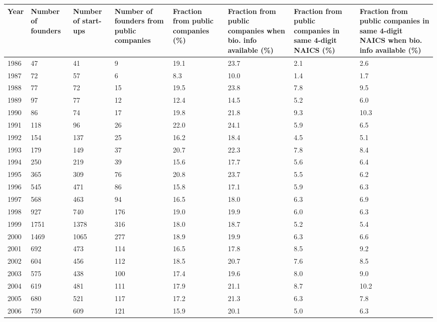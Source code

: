 \begin{table}[!htb]
\centering
\begingroup\scriptsize
\begin{tabular}{p{1.75cm}p{1.75cm}p{1.75cm}p{1.75cm}p{1.75cm}p{1.75cm}p{1.75cm}p{1.75cm}}
  \toprule
Year & Number of founders & Number of start-ups & Number of founders from public companies & Fraction from public companies (\%) & Fraction from public companies when bio. info available (\%) & Fraction from public companies in same 4-digit NAICS (\%) & Fraction from public companies in same 4-digit NAICS when bio. info available (\%) \\ 
  \midrule
1986 & 47 & 41 &  9 & 19.1 & 23.7 & 2.1 & 2.6 \\ 
  1987 & 72 & 57 &  6 & 8.3 & 10.0 & 1.4 & 1.7 \\ 
  1988 & 77 & 72 & 15 & 19.5 & 23.8 & 7.8 & 9.5 \\ 
  1989 & 97 & 77 & 12 & 12.4 & 14.5 & 5.2 & 6.0 \\ 
  1990 & 86 & 74 & 17 & 19.8 & 21.8 & 9.3 & 10.3 \\ 
  1991 & 118 & 96 & 26 & 22.0 & 24.1 & 5.9 & 6.5 \\ 
  1992 & 154 & 137 & 25 & 16.2 & 18.4 & 4.5 & 5.1 \\ 
  1993 & 179 & 149 & 37 & 20.7 & 22.3 & 7.8 & 8.4 \\ 
  1994 & 250 & 219 & 39 & 15.6 & 17.7 & 5.6 & 6.4 \\ 
  1995 & 365 & 309 & 76 & 20.8 & 23.7 & 5.5 & 6.2 \\ 
  1996 & 545 & 471 & 86 & 15.8 & 17.1 & 5.9 & 6.3 \\ 
  1997 & 568 & 463 & 94 & 16.5 & 18.0 & 6.3 & 6.9 \\ 
  1998 & 927 & 740 & 176 & 19.0 & 19.9 & 6.0 & 6.3 \\ 
  1999 & 1751 & 1378 & 316 & 18.0 & 18.7 & 5.2 & 5.4 \\ 
  2000 & 1469 & 1065 & 277 & 18.9 & 19.9 & 6.3 & 6.6 \\ 
  2001 & 692 & 473 & 114 & 16.5 & 17.8 & 8.5 & 9.2 \\ 
  2002 & 604 & 456 & 112 & 18.5 & 20.7 & 7.6 & 8.5 \\ 
  2003 & 575 & 438 & 100 & 17.4 & 19.6 & 8.0 & 9.0 \\ 
  2004 & 619 & 481 & 111 & 17.9 & 21.1 & 8.7 & 10.2 \\ 
  2005 & 680 & 521 & 117 & 17.2 & 21.3 & 6.3 & 7.8 \\ 
  2006 & 759 & 609 & 121 & 15.9 & 20.1 & 5.0 & 6.3 \\ 

\end{tabular}
\end{table}

